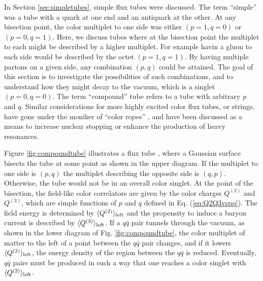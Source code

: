 \documentclass[aps, prc, 12pt, nofootinbib, showpacs, superscriptaddress, tightenlines, groupedaddress]{revtex4-2}
\begin{document}
In Section \ref{sec:simpletubes}, simple flux tubes were discussed. The term ``simple'' was a tube with a quark at one end and an antiquark at the other. At any bisection point, the color multiplet to one side was either $(p=1,q=0)$ or $(p=0,q=1)$. Here, we discuss tubes where at the bisection point the multiplet to each might be described by a higher multiplet. For example havin a gluon to each side would be described by the octet $(p=1,q=1)$. By having multiple partons on a given side, any combination $(p,q)$ could be attained. The goal of this section is to investigate the possibilities of such combinations, and to understand how they might decay to the vacuum, which is a singlet $(p=0,q=0)$. The term ``compound'' tube refers to a tube with arbitrary $p$ and $q$. Similar considerations for more highly excited color flux tubes, or strings, have gone under the moniker of ``color ropes'' \cite{Sorge:1995dp,Goswami:2019mta}, and have been discussed as a means to increase nuclear stopping or enhance the production of heavy resonances.

Figure \ref{fig:compoundtube} illustrates a flux tube , where a Gaussian surface bisects the tube at some point as shown in the upper diagram. If the multiplet to one side is $(p,q)$ the multiplet describing the opposite side is $(q,p)$. Otherwise, the tube would not be in an overall color singlet. At the point of the bisection, the field-like color correlators are given by the color charges $Q^{(2)}$ and $Q^{(3)}$, which are simple functions of $p$ and $q$ defined in Eq. (\ref{eq:Q2Q3vspq}). The field energy is determined by $\langle Q^{(2)}\rangle_{\rm left}$ and the propensity to induce a baryon current is described by $\langle Q^{(3)}\rangle_{\rm left}$. If a $q\bar{q}$ pair tunnels through the vacuum, as shown in the lower diagram of Fig. \ref{fig:compoundtube}, the color multiplet of matter to the left of a point between the $q\bar{q}$ pair changes, and if it lowers $\langle Q^{(2)}\rangle_{\rm left}$, the energy density of the region between the $q\bar{q}$ is reduced. Eventually, $q\bar{q}$ pairs must be produced in such a way that one reaches a color singlet with $\langle Q^{(2)}\rangle_{\rm left}$.
\end{document}
